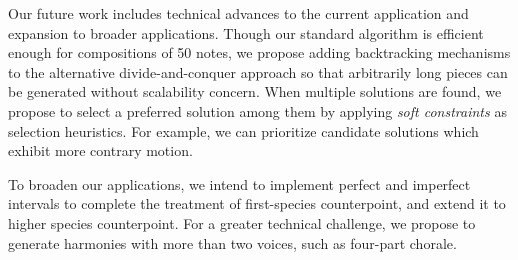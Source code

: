 Our future work includes technical advances to the current application and expansion to broader applications.
Though our standard algorithm is efficient enough for compositions of 50 notes, we propose adding backtracking mechanisms to the alternative divide-and-conquer approach so that arbitrarily long pieces can be generated without scalability concern.
When multiple solutions are found, we propose to select a preferred solution among them by applying \emph{soft constraints} as selection heuristics.
For example, we can prioritize candidate solutions which exhibit more contrary motion.

To broaden our applications, we intend to implement perfect and imperfect intervals to complete the treatment of first-species counterpoint, and extend it to higher species counterpoint.
For a greater technical challenge, we propose to generate harmonies with more than two voices, such as four-part chorale.
